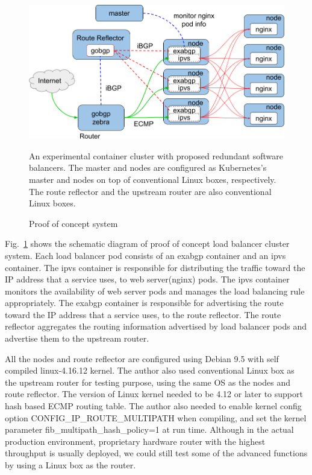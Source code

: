 \begin{figure}[tb]
\begin{center}
\includegraphics[width=0.8\columnwidth]{Figs/poc.png}
\end{center}
\caption{Proof of concept system}
\centering\parbox[c]{0.9\columnwidth}{
  An experimental container cluster with proposed redundant software balancers.
  The master and nodes are configured as Kubernetes's master and nodes on top of conventional Linux boxes, respectively.
  The route reflector and the upstream router are also conventional Linux boxes.
}
\label{fig:poc}
\end{figure}

Fig.~\ref{fig:poc} shows the schematic diagram of proof of concept load balancer cluster system.
%
Each load balancer pod consists of an exabgp container and an ipvs container.
The ipvs container is responsible for distributing the traffic toward the IP address that a service uses, to web server(nginx) pods.
The ipvs container monitors the availability of web server pods and manages the load balancing rule appropriately.
The exabgp container is responsible for advertising the route toward the IP address that a service uses, to the route reflector.
The route reflector aggregates the routing information advertised by load balancer pods and advertise them to the upstream router.

All the nodes and route reflector are configured using Debian 9.5 with self compiled linux-4.16.12 kernel.  
The author also used conventional Linux box as the upstream router for testing purpose, using the same OS as the nodes and route reflector.
The version of Linux kernel needed to be 4.12 or later to support hash based ECMP routing table.
The author also needed to enable kernel config option CONFIG\_IP\_ROUTE\_MULTIPATH\cite{ipsysctl} when compiling, and set the kernel parameter fib\_multipath\_hash\_policy=1 at run time.
Although in the actual production environment, proprietary hardware router with the highest throughput is usually deployed,
we could still test some of the advanced functions by using a Linux box as the router.

